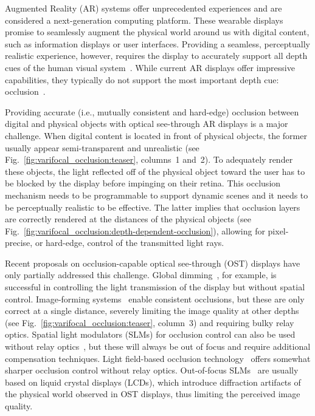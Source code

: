 

Augmented Reality (AR) systems offer unprecedented experiences and are considered a next-generation computing platform. These wearable displays promise to seamlessly augment the physical world around us with digital content, such as information displays or user interfaces. Providing a seamless, perceptually realistic experience, however, requires the display to accurately support all depth cues of the human visual system~\cite{Palmer:1999,Howard:2002}. While current AR displays offer impressive capabilities, they typically do not support the most important depth cue: occlusion~\cite{cutting1995perceiving}.

Providing accurate (i.e., mutually consistent and hard-edge) occlusion between digital and physical objects with optical see-through AR displays is a major challenge. When digital content is located in front of physical objects, the former usually appear semi-transparent and unrealistic (see Fig.~\ref{fig:varifocal_occlusion:teaser}, columns~1 and~2). To adequately render these objects, the light reflected off of the physical object toward the user has to be blocked by the display before impinging on their retina. This occlusion mechanism needs to be programmable to support dynamic scenes and it needs to be perceptually realistic to be effective. The latter implies that occlusion layers are correctly rendered at the distances of the physical objects (see Fig.~\ref{fig:varifocal_occlusion:depth-dependent-occlusion}), allowing for pixel-precise, or hard-edge, control of the transmitted light rays.

Recent proposals on occlusion-capable optical see-through (OST) displays have only partially addressed this challenge. Global dimming~\cite{Mori2018}, for example, is successful in controlling the light transmission of the display but without spatial control. Image-forming systems~\cite{Kiyokawa2003,Cakmakci2004,Gao2012} enable consistent occlusions, but these are only correct at a single distance, severely limiting the image quality at other depths (see Fig.~\ref{fig:varifocal_occlusion:teaser}, column~3) and requiring bulky relay optics. Spatial light modulators (SLMs) for occlusion control can also be used without relay optics~\cite{Itoh2017}, but these will always be out of focus and require additional compensation techniques. Light field-based occlusion technology~\cite{maimone2013computational} offers somewhat sharper occlusion control without relay optics. Out-of-focus SLMs~\cite{maimone2013computational,Itoh2017} are usually based on liquid crystal displays (LCDs), which introduce diffraction artifacts of the physical world observed in OST displays, thus limiting the perceived image quality.

